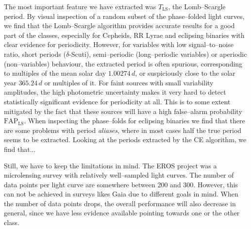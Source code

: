 The most important feature we have extracted was $T_\text{LS}$, the Lomb--Scargle period. By visual inspection of a random subset of the phase--folded light curves, we find that the Lomb--Scargle algorithm provides accurate results for a good part of the classes, especially for Cepheids, RR Lyrae and eclipsing binaries with clear evidence for periodicity. However, for variables with low signal--to--noise ratio, short periods ($\delta$-Scuti), semi--periodic (long--periodic variables) or aperiodic (non--variables) behaviour, the extracted period is often spurious, \eg corresponding to multiples of the mean solar day $1.00274 \, \unit{d}$, or suspiciously close to the solar year $365.24 \, \unit{d}$ or multiples of it. For faint sources with small variability amplitudes, the high photometric uncertainty makes it very hard to detect statistically significant evidence for periodicity at all. This is to some extent mitigated by the fact that these sources will have a high false--alarm probability $\text{FAP}_\text{LS}$. When inspecting the phase--folds for eclipsing binaries we find that there are some problems with period \emph{aliases}, where in most cases half the true period seems to be extracted. Looking at the periods extracted by the CE algorithm, we find that...\\







Still, we have to keep the limitations in mind. The EROS project was a microlensing survey with relatively well--sampled light curves. The number of data points per light curve are somewhere between 200 and 300. However, this can not be achieved in surveys likes Gaia due to different goals in mind. When the number of data points drops, the overall performance will also decrease in general, since we have less evidence available pointing towards one or the other class.\\

